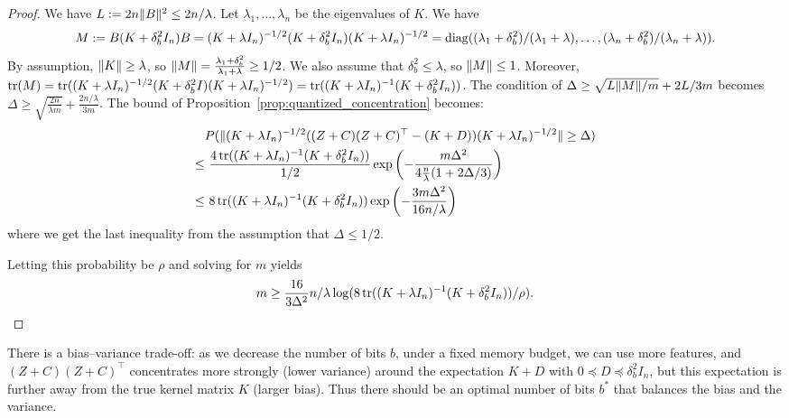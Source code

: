 \begin{proof}
  We have $L := 2n \|B\|^2 \leq 2n/\lambda$.
  Let $\lambda_1, \dots, \lambda_n$ be the eigenvalues of $K$.
  We have
  \begin{equation*}
    M \defeq B(K + \delta^2_b I_n) B =  (K + \lambda I_n)^{-1/2} (K + \delta^2_b I_n) (K + \lambda
    I_n)^{-1/2} = \diag((\lambda_1 + \delta^2_b)/(\lambda_1 + \lambda), \dots,
    (\lambda_n + \delta^2_b) / (\lambda_n + \lambda)).
  \end{equation*}
  By assumption, $\|K\| \geq \lambda$, so $\|M\| = \frac{\lambda_1 + \delta^2_b}{\lambda_1 + \lambda} \geq
  1/2$.
  We also assume that $\delta^2_b \leq \lambda$, so $\|M\| \leq 1$.
  Moreover, $\mathop{\rm tr}(M) = \mathop{\rm tr}((K + \lambda I_n)^{-1/2} (K + \delta^2_b I) (K + \lambda I_n)^{-1/2}) =
  \mathop{\rm tr}((K + \lambda I_n)^{-1} (K + \delta^2_b I_n))$.
  The condition of $\Delta \geq \sqrt{L \|M\| / m} + 2L/3m$ becomes $\Delta \geq \sqrt{\frac{2n}{\lambda m}} + \frac{2n/\lambda}{3m}$.
  The bound of Proposition~\ref{prop:quantized_concentration} becomes:
  \begin{align*}
    &P(\|(K + \lambda I_n)^{-1/2} ((Z + C) (Z + C)^\top - (K + D)) (K + \lambda
      I_n)^{-1/2}\| \geq \Delta) \\
    \leq&\ \frac{4 \mathop{\rm tr}((K + \lambda I_n)^{-1} (K + \delta^2_b I_n))}{1/2} \exp \left( -\frac{m
      \Delta^2}{4\frac{n}{\lambda} (1 + 2\Delta/3)} \right) \\
    \leq&\ 8 \mathop{\rm tr}((K + \lambda I_n)^{-1} (K + \delta^2_b I_n)) \exp \left( -\frac{3m\Delta^2}{16n/\lambda} \right)
  \end{align*}
  where we get the last inequality from the assumption that $\Delta \leq 1/2$.

  Letting this probability be $\rho$ and solving for $m$ yields
  \begin{equation*}
    m \geq \frac{16}{3 \Delta^2} n/\lambda \log (8 \mathop{\rm tr}((K + \lambda I_n)^{-1} (K + \delta^2_b I_n)) / \rho).
  \end{equation*}

\end{proof}

There is a bias--variance trade-off: as we decrease the number of bits $b$, under
a fixed memory budget, we can use more features, and $(Z + C)(Z + C)^\top$
concentrates more strongly (lower variance) around the expectation $K + D$ with
$0 \preceq D \preceq \delta^2_b I_n$, but this expectation is further away from the true kernel
matrix $K$ (larger bias).
Thus there should be an optimal number of bits $b^*$ that balances the bias and
the variance.

